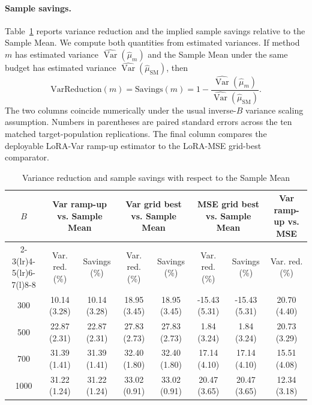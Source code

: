 \documentclass[11pt]{article}
\newcommand{\Var}{\operatorname{Var}}
\begin{document}
\paragraph{Sample savings.}
Table~\ref{tab:sample_savings} reports variance reduction and the implied sample savings relative
to the Sample Mean. We compute both quantities from estimated variances. If method $m$ has
estimated variance $\widehat{\Var}(\hat\mu_m)$ and the Sample Mean under the same budget has
estimated variance $\widehat{\Var}(\hat\mu_{\mathrm{SM}})$, then
\[
    \mathrm{VarReduction}(m)
    =
    \mathrm{Savings}(m)
    =
    1-
    \frac{\widehat{\Var}(\hat\mu_m)}
         {\widehat{\Var}(\hat\mu_{\mathrm{SM}})} .
\]
The two columns coincide numerically under the usual inverse-$B$ variance scaling assumption.
Numbers in parentheses are paired standard errors across the ten matched target-population
replications. The final column compares the deployable LoRA-Var ramp-up estimator to the
LoRA-MSE grid-best comparator.

\begin{table}[H]
\centering
\caption{Variance reduction and sample savings with respect to the Sample Mean}
\label{tab:sample_savings}
\scriptsize
\setlength{\tabcolsep}{2.2pt}
\renewcommand{\arraystretch}{1.08}
\begin{tabular}{@{}c cc cc cc c@{}}
\toprule
$B$ &
\multicolumn{2}{c}{Var ramp-up vs. Sample Mean} &
\multicolumn{2}{c}{Var grid best vs. Sample Mean} &
\multicolumn{2}{c}{MSE grid best vs. Sample Mean} &
Var ramp-up vs. MSE \\
\cmidrule(lr){2-3}\cmidrule(lr){4-5}\cmidrule(lr){6-7}\cmidrule(l){8-8}
& Var. red. (\%) & Savings (\%) & Var. red. (\%) & Savings (\%) &
Var. red. (\%) & Savings (\%) & Var. red. (\%) \\
\midrule
300  & 10.14 (3.28) & 10.14 (3.28) & 18.95 (3.45) & 18.95 (3.45) & -15.43 (5.31) & -15.43 (5.31) & 20.70 (4.40) \\
500  & 22.87 (2.31) & 22.87 (2.31) & 27.83 (2.73) & 27.83 (2.73) & 1.84 (3.24) & 1.84 (3.24) & 20.73 (3.29) \\
700  & 31.39 (1.41) & 31.39 (1.41) & 32.40 (1.80) & 32.40 (1.80) & 17.14 (4.10) & 17.14 (4.10) & 15.51 (4.08) \\
1000 & 31.22 (1.24) & 31.22 (1.24) & 33.02 (0.91) & 33.02 (0.91) & 20.47 (3.65) & 20.47 (3.65) & 12.34 (3.18) \\
\bottomrule
\end{tabular}
\end{table}
\end{document}

